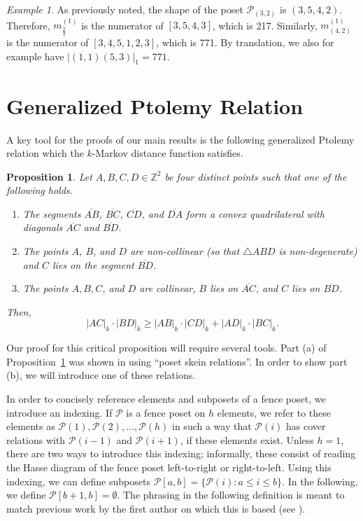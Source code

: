 \documentclass{article}
\newtheorem{prop}[theorem]{Proposition}
\theoremstyle{remark}
\newtheorem{example}[theorem]{Example}
\newcommand{\calP}{\mathcal{P}}
\begin{document}
\begin{example}
As previously noted, the shape of the poset $\calP_{(3,2)}$ is $(3,5,4,2)$. Therefore, $m^{(1)}_{\frac23}$ is the numerator of $[3,5,4,3]$, which is 217. Similarly, $m^{(1)}_{(4,2)}$ is the numerator of $[3,4,5,1,2,3]$, which is 771. By translation, we also for example have $\vert(1,1)(5,3)\vert_1 = 771$. 
\end{example}

\section{Generalized Ptolemy Relation}\label{sec:Ptolemy}


A key tool for the proofs of our main results is the following generalized Ptolemy relation which the $k$-Markov distance function satisfies. 

\begin{prop}\label{prop:ptolemy}
    Let $A, B, C, D \in \mathbb{Z}^2$ be four distinct points such that one of the following holds.
    \begin{enumerate}
        \item[$(a)$] The segments $\overline{AB}$, $\overline{BC}$, $\overline{CD}$, and $\overline{DA}$ 
        form a convex quadrilateral with diagonals $\overline{AC}$ and $\overline{BD}$.
        
        \item[$(b)$] The points $A$, $B$, and $D$ are non-collinear (so that $\triangle ABD$ is non-degenerate) 
        and $C$ lies on the segment $\overline{BD}$.

        \item[$(c)$] The points $A,B,C$, and $D$ are collinear, $B$ lies on $\overline{AC}$, and $C$ lies on $\overline{BD}$.
    \end{enumerate}
    Then,
    \[
        |AC|_k \cdot |BD|_k \geq |AB|_k \cdot |CD|_k + |AD|_k \cdot |BC|_k.
    \]
\end{prop}

Our proof for this critical proposition will require several tools. Part (a) of Proposition~\ref{prop:ptolemy} was shown in \cite{banaian2025} using ``poset skein relations''. In order to show part (b), we will introduce one of these relations. 

In order to concisely reference elements and subposets of a fence poset, we introduce an indexing. If $\calP$ is a fence poset on $h$ elements, we refer to these elements as $\calP(1),\calP(2),\ldots,\calP(h)$ in such a way that $\calP(i)$ has cover relations with $\calP(i-1)$ and $\calP(i+1)$, if these elements exist. Unless $h = 1$, there are two ways to introduce this indexing; informally, these consist of reading the Hasse diagram of the fence poset left-to-right or right-to-left. Using this indexing, we can define subposets $\calP[a,b] = \{\calP(i): a \leq i \leq b\}$. In the following, we define $\calP[b+1,b] = \emptyset$. The phrasing in the following definition is meant to match previous work by the first author on which this is based (see \cite{banaian2025, banaian2024skein}).
\end{document}

